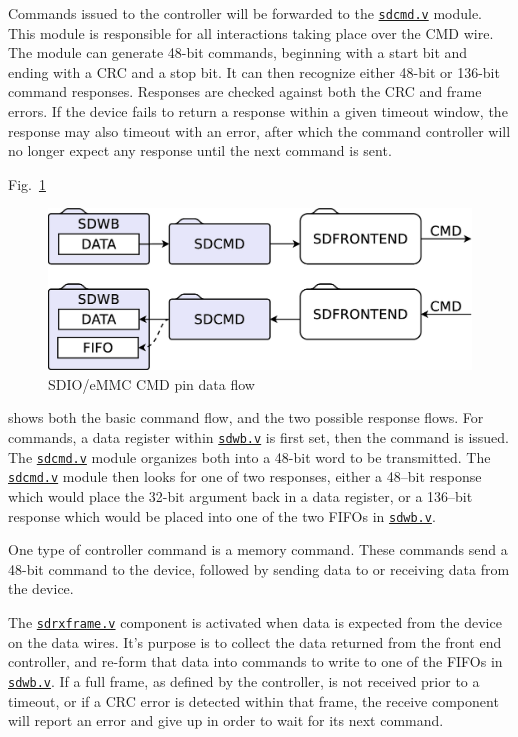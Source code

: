 \documentclass{gqtekspec}
\newcommand{\zhref}[2]{\href{#1}{\textcolor{dkblue}{#2}}}
\begin{document}
Commands issued to the controller will be forwarded to the \zhref{../rtl/sdcmd.v}{\tt sdcmd.v}
module.  This module is responsible for all interactions taking place over
the CMD wire.  The module can generate 48-bit commands, beginning with a
start bit and ending with a CRC and a stop bit.  It can then recognize
either 48-bit or 136-bit command responses.  Responses are checked against
both the CRC and frame errors.  If the device fails to return a response
within a given timeout window, the response may also timeout with an error,
after which the command controller will no longer expect any response until
the next command is sent.

Fig.~\ref{fig:sdcmdflow}
\begin{figure}\begin{center}
\includegraphics[width=5.0in]{gfx/sdiocmdflow.eps}
\caption{SDIO/eMMC CMD pin data flow}\label{fig:sdcmdflow}
\end{center}\end{figure}
shows both the basic command flow, and the two possible response flows.
For commands, a data register within \zhref{../rtl/sdwb.v}{\tt sdwb.v} is first set, then the
command is issued.  The \zhref{../rtl/sdcmd.v}{\tt sdcmd.v} module organizes both into a 48-bit
word to be transmitted.  The \zhref{../rtl/sdcmd.v}{\tt sdcmd.v} module then looks for one of
two responses, either a 48--bit response which would place the 32-bit
argument back in a data register, or a 136--bit response which would be
placed into one of the two FIFOs in \zhref{../rtl/sdwb.v}{\tt sdwb.v}.

One type of controller command is a memory command.  These commands send a
48-bit command to the device, followed by sending data to or receiving data
from the device.

The \zhref{../rtl/sdrxframe.v}{\tt sdrxframe.v} component is activated when data is expected from the
device on the data wires.  It's purpose is to collect the data returned from
the front end controller, and re-form that data into commands to write to
one of the FIFOs in \zhref{../rtl/sdwb.v}{\tt sdwb.v}.  If a full frame, as defined by the
controller, is not received prior to a timeout, or if a CRC error is detected
within that frame, the receive component will report an error and give up
in order to wait for its next command.
\end{document}
